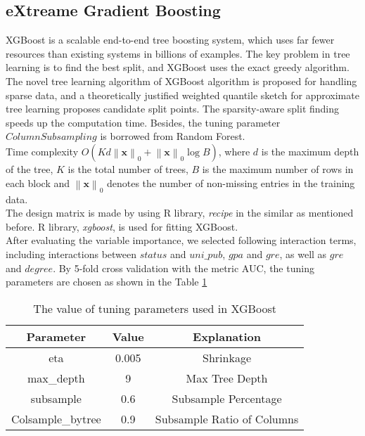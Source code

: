 \subsection{eXtreame Gradient Boosting} \label{sub: xgb}
XGBoost is a scalable end-to-end tree boosting system, which uses far fewer resources than existing systems in billions of examples. The key problem in tree learning is to find the best split, and XGBoost uses the exact greedy algorithm. The novel tree learning algorithm of XGBoost algorithm is proposed for handling sparse data, and a theoretically justified weighted quantile sketch for approximate tree learning proposes candidate split points. The sparsity-aware split finding speeds up the computation time. Besides, the tuning parameter $Column Subsampling$ is borrowed from Random Forest. \\
Time complexity $O(Kd\left\|\mathbf{x}\right\|_0+\left\|\mathbf{x}\right\|_0\log B)$, where $d$ is the maximum depth of the tree, $K$ is the total number of trees, $B$ is the maximum number of rows in each block and $\left\|\mathbf{x}\right\|_0$ denotes the number of non-missing entries in the training data\cite{chen:2016:xgboost}. \\
The design matrix is made by using R library, {\itshape recipe} in the similar as mentioned before. R library, {\itshape xgboost}, is used for fitting XGBoost. \\
After evaluating the variable importance, we selected following interaction terms, including interactions between $status$ and $uni\_pub$, $gpa$ and $gre$, as well as $gre$ and $degree$. 
By 5-fold cross validation with the metric AUC, the tuning parameters are chosen as shown in the Table \ref{tab:xgbpar}
\begin{table}[h]
    \centering
    \begin{tabular}{|c|c|c|}
   \hline 
    Parameter & Value & Explanation \\ 
        \hline
        eta & 0.005 & Shrinkage\\
        \hline 
        max\_depth & 9 & Max Tree Depth \\
        \hline 
        subsample & 0.6 & Subsample Percentage\\
        \hline 
        Colsample\_bytree & 0.9 & Subsample Ratio of Columns \\
        \hline 
    \end{tabular}
    \caption{The value of tuning parameters used in XGBoost}
    \label{tab:xgbpar}
\end{table}
